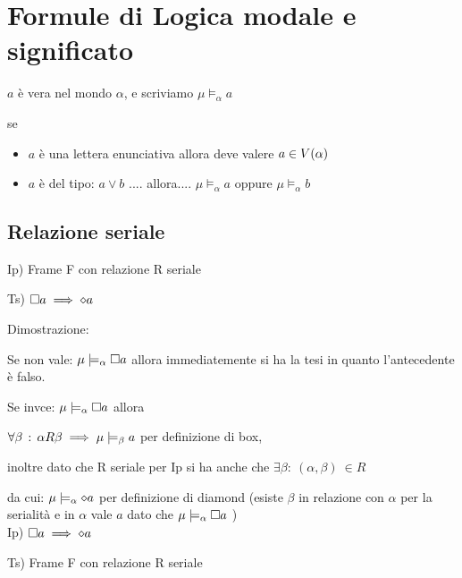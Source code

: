 
\chapter{Formule di Logica modale e significato}

$a$ è vera nel mondo $\alpha$, e scriviamo $\mu\models_{\alpha}a$

se 
\begin{itemize}
\item $a$ è una lettera enunciativa allora deve valere $a\in V(\alpha)$ 
\item $a$ è del tipo: $a\lor b$ .... allora.... $\mu\models_{\alpha}a$
oppure $\mu\models_{\alpha}b$ 
\end{itemize}

\section{Relazione seriale}

Ip) Frame F con relazione R seriale

Ts) $\square a\implies\diamond a$

Dimostrazione:

Se non vale: $\mu\models_{\alpha}\square a$ allora immediatemente si
ha la tesi in quanto l'antecedente è falso.

Se invce: $\mu\models_{\alpha}\square a$ allora

$\forall\beta\,:\,\alpha R\beta\implies\mu\models_{\beta}a$ per definizione
di box,

inoltre dato che R seriale per Ip si ha anche che $\exists\beta:\:(\alpha,\beta)\:\in R$

da cui: $\mu\models_{\alpha}\diamond a$ per definizione di diamond (esiste
$\beta$ in relazione con $\alpha$ per la serialità e in $\alpha$
vale $a$ dato che $\mu\models_{\alpha}\square a$ )\\


Ip) $\square a\implies\diamond a$

Ts) Frame F con relazione R seriale

\begin{center}
$ $\begin{center}  
 \end{center}
\par\end{center}

